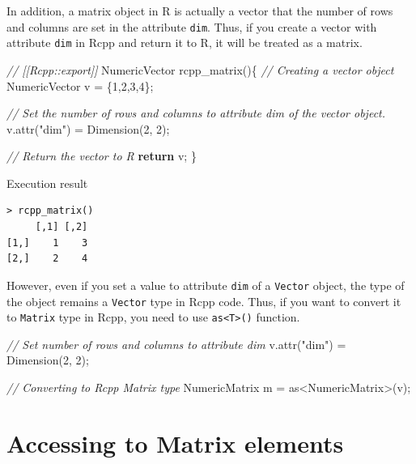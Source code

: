 \documentclass[
]{book}
\newenvironment{Shaded}{\begin{snugshade}}{\end{snugshade}}
\newcommand{\CommentTok}[1]{\textcolor[rgb]{0.56,0.35,0.01}{\textit{#1}}}
\newcommand{\ControlFlowTok}[1]{\textcolor[rgb]{0.13,0.29,0.53}{\textbf{#1}}}
\newcommand{\DecValTok}[1]{\textcolor[rgb]{0.00,0.00,0.81}{#1}}
\newcommand{\NormalTok}[1]{#1}
\newcommand{\StringTok}[1]{\textcolor[rgb]{0.31,0.60,0.02}{#1}}
\begin{document}
In addition, a matrix object in R is actually a vector that the number of rows and columns are set in the attribute \texttt{dim}. Thus, if you create a vector with attribute \texttt{dim} in Rcpp and return it to R, it will be treated as a matrix.

\begin{Shaded}
\begin{Highlighting}[]
\CommentTok{// [[Rcpp::export]]}
\NormalTok{NumericVector rcpp_matrix()\{}
    \CommentTok{// Creating a vector object}
\NormalTok{    NumericVector v = \{}\DecValTok{1}\NormalTok{,}\DecValTok{2}\NormalTok{,}\DecValTok{3}\NormalTok{,}\DecValTok{4}\NormalTok{\};}

    \CommentTok{// Set the number of rows and columns to attribute dim of the vector object.}
\NormalTok{    v.attr(}\StringTok{"dim"}\NormalTok{) = Dimension(}\DecValTok{2}\NormalTok{, }\DecValTok{2}\NormalTok{);}

    \CommentTok{// Return the vector to R}
    \ControlFlowTok{return}\NormalTok{ v;}
\NormalTok{\}}
\end{Highlighting}
\end{Shaded}

Execution result

\begin{verbatim}
> rcpp_matrix()
     [,1] [,2]
[1,]    1    3
[2,]    2    4
\end{verbatim}

However, even if you set a value to attribute \texttt{dim} of a \texttt{Vector} object, the type of the object remains a \texttt{Vector} type in Rcpp code. Thus, if you want to convert it to \texttt{Matrix} type in Rcpp, you need to use \texttt{as\textless{}T\textgreater{}()} function.

\begin{Shaded}
\begin{Highlighting}[]
\CommentTok{// Set number of rows and columns to attribute dim}
\NormalTok{v.attr(}\StringTok{"dim"}\NormalTok{) = Dimension(}\DecValTok{2}\NormalTok{, }\DecValTok{2}\NormalTok{);}

\CommentTok{// Converting to Rcpp Matrix type}
\NormalTok{NumericMatrix m = as<NumericMatrix>(v);}
\end{Highlighting}
\end{Shaded}

\hypertarget{accessing-to-matrix-elements}{%
\section{Accessing to Matrix elements}\label{accessing-to-matrix-elements}}
\end{document}
